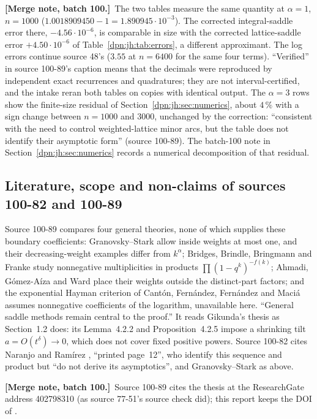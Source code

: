 \documentclass[11pt]{article}
\numberwithin{equation}{section}
\theoremstyle{definition}\newtheorem{definition}[theorem]{Definition}
\theoremstyle{remark}\newtheorem{remark}[theorem]{Remark}
\newcommand{\src}[1]{\textup{(source #1)}}
\newcommand{\mergenoted}[1]{\par\smallskip\noindent\textbf{[Merge note, batch 100.]}\ #1\par\smallskip}
\begin{document}
\mergenoted{The two tables measure the same quantity at $\alpha=1$, $n=1000$
($1.0018909450-1=1.890945\cdot10^{-3}$).  The corrected integral-saddle error
there, $-4.56\cdot10^{-6}$, is comparable in size with the corrected
lattice-saddle error $+4.50\cdot10^{-6}$ of Table~\ref{dpn:jh:tab:errors}, a
different approximant.  The log errors continue source 48's ($3.55$ at
$n=6400$ for the same four terms).  ``Verified'' in source 100-89's caption
means that the decimals were reproduced by independent exact recurrences and
quadratures; they are not interval-certified, and the intake reran both
tables on copies with identical output.  The $\alpha=3$ rows show the
finite-size residual of Section~\ref{dpn:jh:sec:numerics}, about $4\,\%$ with
a sign change between $n=1000$ and $3000$, unchanged by the correction:
``consistent with the need to control weighted-lattice minor arcs, but the
table does not identify their asymptotic form'' \src{100-89}.  The batch-100
note in Section~\ref{dpn:jh:sec:numerics} records a numerical decomposition of
that residual.}

\subsection{Literature, scope and non-claims of sources 100-82 and 100-89}\label{dpn:rb:sec:scope}
Source 100-89 compares four general theories, none of which supplies these
boundary coefficients: Granovsky--Stark \cite{GS} allow inside weights at most
one, and their decreasing-weight examples differ from $k^\alpha$;
Bridges, Brindle, Bringmann and Franke \cite{BBBF} study nonnegative
multiplicities in products $\prod(1-q^k)^{-f(k)}$; Ahmadi, G\'omez-A\'iza and
Ward \cite{AGW} place their weights outside the distinct-part factors; and the
exponential Hayman criterion of Cant\'on, Fern\'andez, Fern\'andez and Maci\'a
\cite{Canton} assumes nonnegative coefficients of the logarithm, unavailable
here.  ``General saddle methods remain central to the proof.''  It reads
Gikunda's thesis \cite{gikunda} as Section~1.2 does: its Lemma~4.2.2 and
Proposition~4.2.5 impose a shrinking tilt $a=O(t^\delta)\to0$, which does not
cover fixed positive powers.  Source 100-82 cites Naranjo and Ram\'irez
\cite{NR}, ``printed page~12'', who identify this sequence and product but
``do not derive its asymptotics'', and Granovsky--Stark as above.
\mergenoted{Source 100-89 cites the thesis at the ResearchGate address
402798310 (as source 77-51's source check did); this report keeps the DOI of
\cite{gikunda}.}
\end{document}

